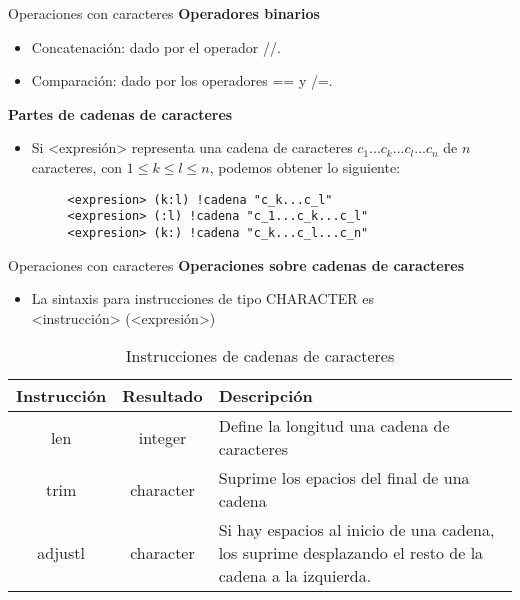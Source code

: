 \begin{frame}[fragile]{Operaciones con caracteres}
\textbf{Operadores binarios}
 \begin{itemize}[<+(1)->]  
    \item Concatenación: dado por el operador //.
    \item Comparación: dado por los operadores == y /=.
 \end{itemize}

\textbf{Partes de cadenas de caracteres}
 \begin{itemize}[<+(2)->]  
    \item Si <expresión> representa una cadena de caracteres $c_{1}...c_{k}...c_{l}...c_{n}$ de $n$ caracteres, con $1 \leq k \leq l \leq n$, podemos obtener lo siguiente:
    \vspace{0.2cm} 
    \begin{verbatim}
     <expresion> (k:l) !cadena "c_k...c_l"
     <expresion> (:l) !cadena "c_1...c_k...c_l"
     <expresion> (k:) !cadena "c_k...c_l...c_n"
     \end{verbatim}  
 \end{itemize}
\end{frame}

\begin{frame}[fragile]{Operaciones con caracteres}
\textbf{Operaciones sobre cadenas de caracteres}
 \begin{itemize}[<+(1)->]
  \item La sintaxis para instrucciones de tipo CHARACTER es \\
    \centering <instrucción> (<expresión>)
 \end{itemize}

  \begin{table}[]
    \centering
    \label{Tabla_funcionesintr}
    \resizebox{10.5cm}{!} {
    \begin{tabular}{|c|c|p{6cm}|}
    \hline
    Instrucción  & Resultado  & Descripción                                                                                                    \\ \hline
    len          & integer    & Define la longitud una cadena de caracteres                                                                    \\ \hline
    trim         & character  & Suprime los epacios del final de una cadena                                                                    \\ \hline
    adjustl      & character  & Si hay espacios al inicio de una cadena, los suprime desplazando el resto de la cadena a la izquierda.        \\ \hline
    \end{tabular}}
    \caption*{Instrucciones de cadenas de caracteres}
    \end{table}
\end{frame}



